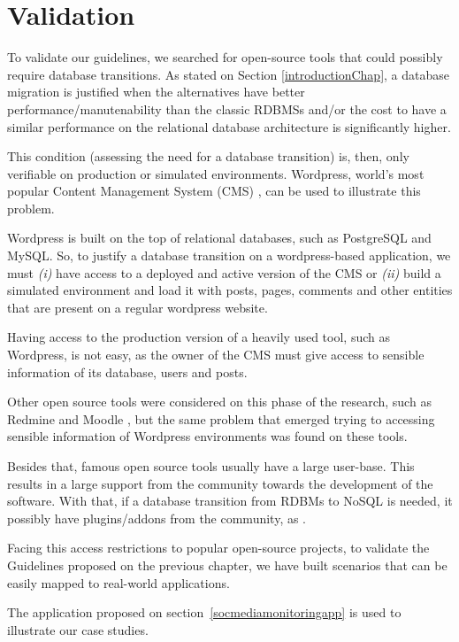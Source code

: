 \chapter{Validation}\label{validationChap}

To validate our guidelines, we searched for open-source tools that could possibly require database transitions. As stated on Section \ref{introductionChap}, a database migration is justified when the alternatives have better performance/manutenability than the classic RDBMSs and/or the cost to have a similar performance on the relational database architecture is significantly higher.

This condition (assessing the need for a database transition) is, then, only verifiable on production or simulated environments. Wordpress\cite{wordpress}, world's most popular Content Management System (CMS)  \cite{cmsranking}, can be used to illustrate this problem.  

Wordpress is built on the top of relational databases, such as PostgreSQL and MySQL. So, to justify a database transition on a wordpress-based application, we must \textit{(i)} have access to a deployed and active version of the CMS or \textit{(ii)} build a simulated environment and load it with posts, pages, comments and other entities that are present on a regular wordpress website.

Having access to the production version of a heavily used tool, such as Wordpress, is not easy, as the owner of the CMS must give access to sensible information of its database, users and posts. 

Other open source tools were considered on this phase of the research, such as Redmine \cite{redmine} and Moodle \cite{moodle}, but the same problem that emerged trying to accessing sensible information of Wordpress environments was found on these tools.

Besides that, famous open source tools usually have a large user-base. This results in a large support from the community towards the development of the software. With that, if a database transition from RDBMs to NoSQL is needed, it possibly have plugins/addons from the community, as \cite{fantasticElasticsearch}.

Facing this access restrictions to popular open-source projects, to validate the Guidelines proposed on the previous chapter, we have built scenarios that can be easily mapped to real-world applications.

The application proposed on section~\ref{socmediamonitoringapp} is used to illustrate our case studies.

